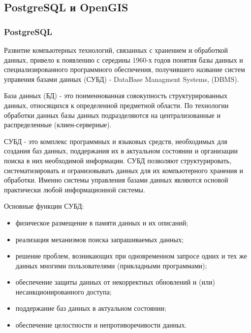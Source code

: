\documentclass[12pt,a4paper,oneside]{article} %
\begin{document}
\newpage
\subsection{PostgreSQL и OpenGIS}
\subsubsection{PostgreSQL}
Развитие компьютерных технологий, связанных с хранением и обработкой \linebreak
данных, привело к появлению с середины 1960-х годов понятия базы \linebreak
данных и специализированного программного обеспечения, получившего \linebreak
название систем управения базами данных (СУБД) - DataBase Managment Systems, (DBMS).

База данных (БД) - это поименнованная совокупность \linebreak
структурированных данных, относящихся к определенной предметной \linebreak
области. По технологии обработки данных базы данных подразделяются на \linebreak
централизованные и распределенные (клиен-серверные).

СУБД - это комплекс программных и языковых средств, необходимых для \linebreak
создания баз данных, поддержания их в актуальном состоянии и организации \linebreak
поиска в них необходимой информации. СУБД позволяют структурировать, \linebreak
систематизировать и огранизовывать данных для их компьютерного хранения и \linebreak
обработки. Именно системы управления базами данных являются основой \linebreak
практически любой информационной системы.

Основные функции СУБД:

\begin{itemize}
\item физическое размещение в памяти данных и их описаний;
\item реализация механизмов поиска запрашиваемых данных;
\item решение проблем, возникающих при одновременном запросе одних и тех \linebreak
же данных многими пользователями (прикладными программами);
\item обеспечение защиты данных от некорректных обновлений и (или) \linebreak
    несанкционированного доступа;
\item поддержание баз данных в актуальном состоянии;
\item обеспечение целостности и непротиворечивости данных.
\end{itemize}
\end{document}
